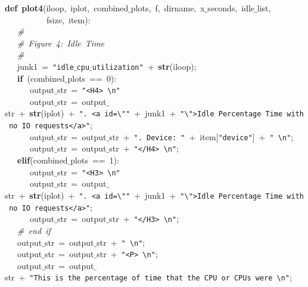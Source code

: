 \mbox{}\textbf{def}\ \textbf{plot4}(iloop,\ iplot,\ combined$\_$plots,\ f,\ dirname,\ x$\_$seconds,\ idle$\_$list, \\
\mbox{}\ \ \ \ \ \ \ \ \ \ fsize,\ item): \\
\mbox{}\ \ \ \textit{\#} \\
\mbox{}\ \ \ \textit{\#\ Figure\ 4:\ Idle\ Time} \\
\mbox{}\ \ \ \textit{\#} \\
\mbox{}\ \ \ junk1\ =\ \texttt{"{}idle$\_$cpu$\_$utilization"{}}\ +\ \textbf{str}(iloop); \\
\mbox{}\ \ \ \textbf{if}\ (combined$\_$plots\ ==\ 0): \\
\mbox{}\ \ \ \ \ \ output$\_$str\ =\ \texttt{"{}\textless{}H4\textgreater{}\ \textbackslash{}n"{}} \\
\mbox{}\ \ \ \ \ \ output$\_$str\ =\ output$\_$str\ +\ \textbf{str}(iplot)\ +\ \texttt{"{}.\ \textless{}a\ id=\textbackslash{}"{}"{}}\ +\ junk1\ +\ \texttt{"{}\textbackslash{}"{}\textgreater{}Idle\ Percentage\ Time\ with\ no\ IO\ requests\textless{}/a\textgreater{}"{}}; \\
\mbox{}\ \ \ \ \ \ output$\_$str\ =\ output$\_$str\ +\ \texttt{"{}.\ Device:\ "{}}\ +\ item[\texttt{"{}device"{}}]\ +\ \texttt{"{}\ \textbackslash{}n"{}}; \\
\mbox{}\ \ \ \ \ \ output$\_$str\ =\ output$\_$str\ +\ \texttt{"{}\textless{}/H4\textgreater{}\ \textbackslash{}n"{}}; \\
\mbox{}\ \ \ \textbf{elif}(combined$\_$plots\ ==\ 1): \\
\mbox{}\ \ \ \ \ \ output$\_$str\ =\ \texttt{"{}\textless{}H3\textgreater{}\ \textbackslash{}n"{}} \\
\mbox{}\ \ \ \ \ \ output$\_$str\ =\ output$\_$str\ +\ \textbf{str}(iplot)\ +\ \texttt{"{}.\ \textless{}a\ id=\textbackslash{}"{}"{}}\ +\ junk1\ +\ \texttt{"{}\textbackslash{}"{}\textgreater{}Idle\ Percentage\ Time\ with\ no\ IO\ requests\textless{}/a\textgreater{}"{}}; \\
\mbox{}\ \ \ \ \ \ output$\_$str\ =\ output$\_$str\ +\ \texttt{"{}\textless{}/H3\textgreater{}\ \textbackslash{}n"{}}; \\
\mbox{}\ \ \ \textit{\#\ end\ if} \\
\mbox{}\ \ \ output$\_$str\ =\ output$\_$str\ +\ \texttt{"{}\ \textbackslash{}n"{}}; \\
\mbox{}\ \ \ output$\_$str\ =\ output$\_$str\ +\ \texttt{"{}\textless{}P\textgreater{}\ \textbackslash{}n"{}}; \\
\mbox{}\ \ \ output$\_$str\ =\ output$\_$str\ +\ \texttt{"{}This\ is\ the\ percentage\ of\ time\ that\ the\ CPU\ or\ CPUs\ were\ \textbackslash{}n"{}}; \\
